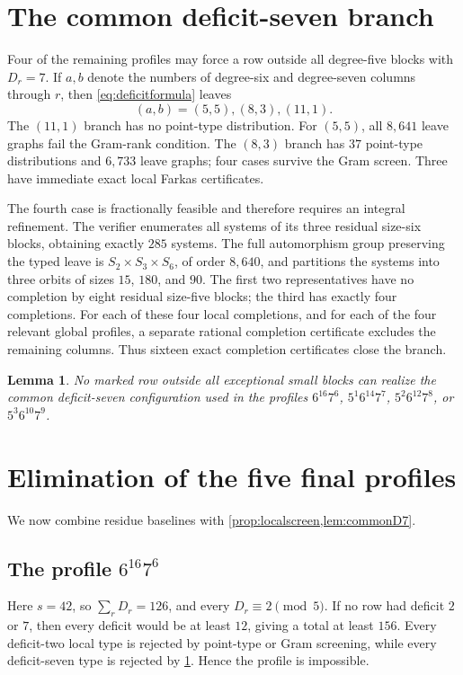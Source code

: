 \documentclass[10pt,a4paper]{amsart}
\newtheorem{lemma}[theorem]{Lemma}
\begin{document}
\section{The common deficit-seven branch}
Four of the remaining profiles may force a row outside all degree-five blocks with $D_r=7$. If $a,b$ denote the numbers of degree-six and degree-seven columns through $r$, then \eqref{eq:deficitformula} leaves
\[
 (a,b)=(5,5),(8,3),(11,1).
\]
The $(11,1)$ branch has no point-type distribution. For $(5,5)$, all $8{,}641$ leave graphs fail the Gram-rank condition. The $(8,3)$ branch has $37$ point-type distributions and $6{,}733$ leave graphs; four cases survive the Gram screen. Three have immediate exact local Farkas certificates.

The fourth case is fractionally feasible and therefore requires an integral refinement. The verifier enumerates all systems of its three residual size-six blocks, obtaining exactly $285$ systems. The full automorphism group preserving the typed leave is $S_2\times S_3\times S_6$, of order $8{,}640$, and partitions the systems into three orbits of sizes $15$, $180$, and $90$. The first two representatives have no completion by eight residual size-five blocks; the third has exactly four completions. For each of these four local completions, and for each of the four relevant global profiles, a separate rational completion certificate excludes the remaining columns. Thus sixteen exact completion certificates close the branch.

\begin{lemma}\label{lem:commonD7}
No marked row outside all exceptional small blocks can realize the common deficit-seven configuration used in the profiles $6^{16}7^6$, $5^1 6^{14}7^7$, $5^2 6^{12}7^8$, or $5^3 6^{10}7^9$.
\end{lemma}

\section{Elimination of the five final profiles}
We now combine residue baselines with \cref{prop:localscreen,lem:commonD7}.

\subsection{The profile $6^{16}7^6$}
Here $s=42$, so $\sum_rD_r=126$, and every $D_r\equiv2\pmod5$. If no row had deficit $2$ or $7$, then every deficit would be at least $12$, giving a total at least $156$. Every deficit-two local type is rejected by point-type or Gram screening, while every deficit-seven type is rejected by \cref{lem:commonD7}. Hence the profile is impossible.
\end{document}
